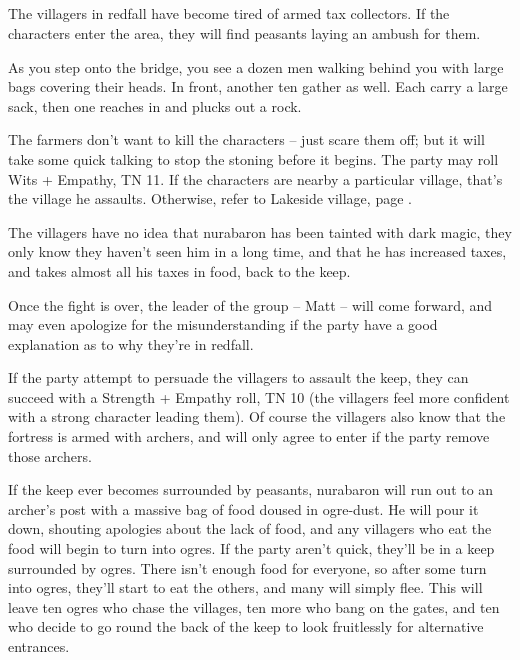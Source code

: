 \subsection{}

\begin{multicols}{2}

\noindent The villagers in \gls{redfall} have become tired of armed tax collectors.  If the characters enter the area, they will find peasants laying an ambush for them.

\begin{boxtext}

	As you step onto the bridge, you see a dozen men walking behind you with large bags covering their heads.  In front, another ten gather as well.  Each carry a large sack, then one reaches in and plucks out a rock.

\end{boxtext}

The farmers don't want to kill the characters -- just scare them off; but it will take some quick talking to stop the stoning before it begins.  The party may roll Wits + Empathy, TN 11.
If the characters are nearby a particular village, that's the village he assaults.
Otherwise, refer to Lakeside village, page \pageref{lakeside}.

The villagers have no idea that \gls{nurabaron} has been tainted with dark magic, they only know they haven't seen him in a long time, and that he has increased taxes, and takes almost all his taxes in food, back to the keep.


Once the fight is over, the leader of the group -- Matt -- will come forward, and may even apologize for the misunderstanding if the party have a good explanation as to why they're in \gls{redfall}.

If the party attempt to persuade the villagers to assault the keep, they can succeed with a Strength + Empathy roll, TN 10
(the villagers feel more confident with a strong character leading them).
Of course the villagers also know that the fortress is armed with archers, and will only agree to enter if the party remove those archers.

If the keep ever becomes surrounded by peasants, \gls{nurabaron} will run out to an archer's post with a massive bag of food doused in ogre-dust.
He will pour it down, shouting apologies about the lack of food, and any villagers who eat the food will begin to turn into ogres.
If the party aren't quick, they'll be in a keep surrounded by ogres.
There isn't enough food for everyone, so after some turn into ogres, they'll start to eat the others, and many will simply flee.
This will leave ten ogres who chase the villages, ten more who bang on the gates, and ten who decide to go round the back of the keep to look fruitlessly for alternative entrances.


\end{multicols}
